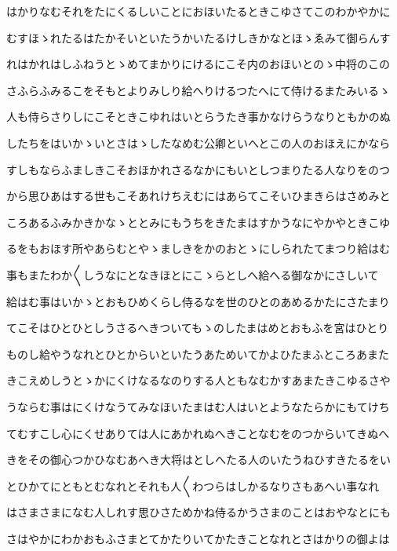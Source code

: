 \documentclass[a4paper,11pt,landscape]{ltjtarticle}
\begin{document}
\par\medskip
はかりなむそれをたにくるしいことにおほいたるときこゆさてこのわかやかに
\par\medskip
むすほゝれたるはたかそいといたうかいたるけしきかなとほゝゑみて御らんす
\par\medskip
れはかれはしふねうとゝめてまかりにけるにこそ内のおほいとのゝ中将のこの
\par\medskip
さふらふみるこをそもとよりみしり給へりけるつたへにて侍けるまたみいるゝ
\par\medskip
人も侍らさりしにこそときこゆれはいとらうたき事かなけらうなりともかのぬ
\par\medskip
したちをはいかゝいとさはゝしたなめむ公卿といへとこの人のおほえにかなら
\par\medskip
すしもならふましきこそおほかれさるなかにもいとしつまりたる人なりをのつ
\par\medskip
から思ひあはする世もこそあれけちえむにはあらてこそいひまきらはさめみと
\par\medskip
ころあるふみかきかなゝととみにもうちをきたまはすかうなにやかやときこゆ
\par\medskip
るをもおほす所やあらむとやゝましきをかのおとゝにしられたてまつり給はむ
\par\medskip
事もまたわか〱しうなにとなきほとにこゝらとしへ給へる御なかにさしいて
\par\medskip
給はむ事はいかゝとおもひめくらし侍るなを世のひとのあめるかたにさたまり
\par\medskip
てこそはひとひとしうさるへきついてもゝのしたまはめとおもふを宮はひとり
\par\medskip
ものし給やうなれとひとからいといたうあためいてかよひたまふところあまた
\par\medskip
きこえめしうとゝかにくけなるなのりする人ともなむかすあまたきこゆるさや
\par\medskip
うならむ事はにくけなうてみなほいたまはむ人はいとようなたらかにもてけち
\par\medskip
てむすこし心にくせありては人にあかれぬへきことなむをのつからいてきぬへ
\par\medskip
きをその御心つかひなむあへき大将はとしへたる人のいたうねひすきたるをい
\par\medskip
とひかてにともとむなれとそれも人〱わつらはしかるなりさもあへい事なれ
\par\medskip
はさまさまになむ人しれす思ひさためかね侍るかうさまのことはおやなとにも
\par\medskip
さはやかにわかおもふさまとてかたりいてかたきことなれとさはかりの御よは
\end{document}
